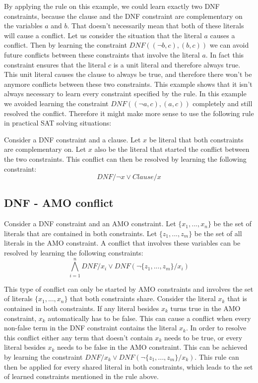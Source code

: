 By applying the rule on this example, we could learn exactly two DNF constraints, because the clause and the DNF constraint are complementary on the variables $a$ and $b$. That doesn't necessarily mean that both of these literals will cause a conflict. Let us consider the situation that the literal $a$ causes a conflict. Then by learning the constraint $DNF((\neg b, c),(b,c))$ we can avoid future conflicts between these constraints that involve the literal $a$. In fact this constraint ensures that the literal $c$ is a unit literal and therefore always true. This unit literal causes the clause to always be true, and therefore there won't be anymore conflicts between these two constraints. This example shows that it isn't always necessary to learn every constraint specified by the rule. In this example we avoided learning the constraint $DNF((\neg a, c),(a,c))$ completely and still resolved the conflict. Therefore it might make more sense to use the following rule in practical SAT solving situations:

\begin{leftbar}
Consider a DNF constraint and a clause. Let $x$ be literal that both constraints are complementary on. Let $x$ also be the literal that started the conflict between the two constraints. This conflict can then be resolved by learning the following constraint:
\begin{displaymath}
DNF / \neg x \vee Clause / x
\end{displaymath}
\end{leftbar}

\subsection{DNF - AMO conflict}

\begin{leftbar}
Consider a DNF constraint and an AMO constraint. Let $\{x_1,...,x_n\}$ be the set of literals that are contained in both constraints. Let $\{z_1,...,z_m\}$ be the set of all literals in the AMO constraint. A conflict that involves these variables can be resolved by learning the following constraints:
\begin{displaymath}
\bigwedge_{i=1}^{n} DNF / x_i \vee DNF(\neg \{z_1,...,z_m\}/x_i)
\end{displaymath}
\end{leftbar}

This type of conflict can only be started by AMO constraints and involves the set of literals $\{x_1,...,x_n\}$ that both constraints share. Consider the literal $x_k$ that is contained in both constraints. If any literal besides $x_k$ turns true in the AMO constraint, $x_k$ automatically has to be false. This can cause a conflict when every non-false term in the DNF constraint contains the literal $x_k$. In order to resolve this conflict either any term that doesn't contain $x_k$ needs to be true, or every literal besides $x_k$ needs to be false in the AMO constraint. This can be achieved by learning the constraint $DNF / x_k \vee DNF(\neg \{z_1,...,z_m\}/x_k)$. This rule can then be applied for every shared literal in both constraints, which leads to the set of learned constraints mentioned in the rule above.

